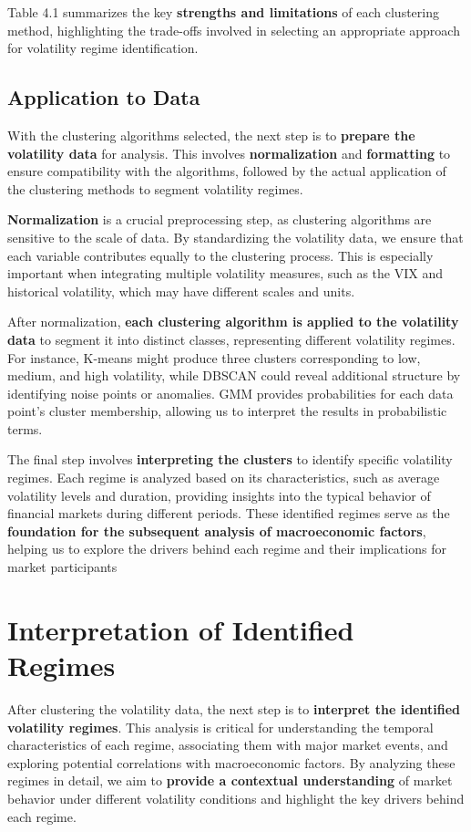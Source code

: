 Table 4.1 summarizes the key \textbf{strengths and limitations} of each clustering method, highlighting the trade-offs involved in selecting an appropriate approach for volatility regime identification.

\subsection{Application to Data}

With the clustering algorithms selected, the next step is to \textbf{prepare the volatility data} for analysis. This involves \textbf{normalization} and \textbf{formatting} to ensure compatibility with the algorithms, followed by the actual application of the clustering methods to segment volatility regimes.

\textbf{Normalization} is a crucial preprocessing step, as clustering algorithms are sensitive to the scale of data. By standardizing the volatility data, we ensure that each variable contributes equally to the clustering process. This is especially important when integrating multiple volatility measures, such as the VIX and historical volatility, which may have different scales and units.

After normalization, \textbf{each clustering algorithm is applied to the volatility data} to segment it into distinct classes, representing different volatility regimes. For instance, K-means might produce three clusters corresponding to low, medium, and high volatility, while DBSCAN could reveal additional structure by identifying noise points or anomalies. GMM provides probabilities for each data point’s cluster membership, allowing us to interpret the results in probabilistic terms.

The final step involves \textbf{interpreting the clusters} to identify specific volatility regimes. Each regime is analyzed based on its characteristics, such as average volatility levels and duration, providing insights into the typical behavior of financial markets during different periods. These identified regimes serve as the \textbf{foundation for the subsequent analysis of macroeconomic factors}, helping us to explore the drivers behind each regime and their implications for market participants

\section{Interpretation of Identified Regimes}

After clustering the volatility data, the next step is to \textbf{interpret the identified volatility regimes}. This analysis is critical for understanding the temporal characteristics of each regime, associating them with major market events, and exploring potential correlations with macroeconomic factors. By analyzing these regimes in detail, we aim to \textbf{provide a contextual understanding} of market behavior under different volatility conditions and highlight the key drivers behind each regime.

